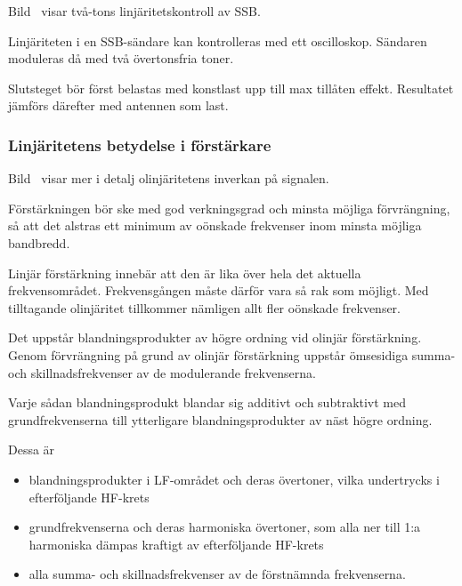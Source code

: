 
Bild~ visar två-tons linjäritetskontroll av SSB.

Linjäriteten i en SSB-sändare kan kontrolleras med ett oscilloskop.
Sändaren moduleras då med två övertonsfria toner.

Slutsteget bör först belastas med konstlast upp till max tillåten effekt.
Resultatet jämförs därefter med antennen som last.

\newpage
\subsubsection{Linjäritetens betydelse i förstärkare}


Bild~ visar mer i detalj olinjäritetens inverkan på
signalen.

Förstärkningen bör ske med god verkningsgrad och minsta möjliga förvrängning,
så att det alstras ett minimum av oönskade frekvenser inom minsta möjliga
bandbredd.

Linjär förstärkning innebär att den är lika över hela det aktuella
frekvensområdet.
Frekvensgången måste därför vara så rak som möjligt.
Med tilltagande olinjäritet tillkommer nämligen allt fler oönskade frekvenser.

Det uppstår blandningsprodukter av högre ordning vid olinjär förstärkning.
Genom förvrängning på grund av olinjär förstärkning uppstår ömsesidiga summa-
och skillnadsfrekvenser av de modulerande frekvenserna.

Varje sådan blandningsprodukt blandar sig additivt och subtraktivt med
grundfrekvenserna till ytterligare blandningsprodukter av näst högre ordning.

Dessa är
\begin{itemize}
\item blandningsprodukter i LF-området och deras övertoner, vilka
  undertrycks i efterföljande HF-krets

\item grundfrekvenserna och deras harmoniska övertoner, som alla ner
  till 1:a harmoniska dämpas kraftigt av efterföljande HF-krets

\item alla summa- och skillnadsfrekvenser av de förstnämnda frekvenserna.
\end{itemize}

